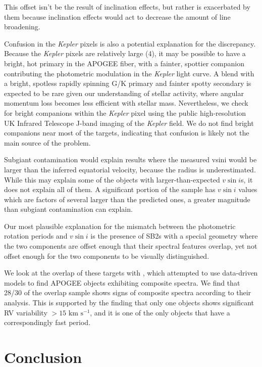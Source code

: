 \documentclass[manuscript]{aastex6}
\newcommand{\vsini}{\ensuremath{v \sin i}}
\newcommand{\Kepler}{\mbox{\textit{Kepler}}}
\newcommand{\kms}{\textrm{ km~s}\ensuremath{^{-1}}}
\begin{document}
This offset isn't be the result of inclination effects, but rather is
exacerbated by them because inclination effects would act to decrease the
amount of line broadening.

Confusion in the \Kepler{} pixels is also a potential explanation for the
discrepancy. Because the \Kepler{} pixels are relatively large (4\arcsec), it
may be possible to have a bright, hot primary in the APOGEE fiber, with a
fainter, spottier companion contributing the photometric modulation in the
\Kepler{} light curve. A blend with a bright, spotless rapidly spinning G/K 
primary and fainter spotty secondary is expected to be rare given our 
understanding of stellar activity, where angular momentum loss becomes less
efficient with stellar mass. Nevertheless, we check for bright companions
within the \Kepler{} pixel using the public high-resolution UK Infrared Telescope
J-band imaging of the \Kepler{} field. We do not find bright companions near
most of the targets, indicating that confusion is likely not the main source of
the problem.

Subgiant contamination would explain results where the measured vsini would be
larger than the inferred equatorial velocity, because the radius is
underestimated. While this may explain some of the objects with
larger-than-expected \vsini{}s, it does not explain all of them. A significant
portion of the sample has \vsini{} values which are factors of several larger
than the predicted ones, a greater magnitude than subgiant contamination can 
explain.

Our most plausible explanation for the mismatch between the photometric
rotation periods and \vsini{} is the presence of SB2s with a special geometry
where the two components are offset enough that their spectral features
overlap, yet not offset enough for the two components to be visually
distinguished. 

We look at the overlap of these targets with \citep{ElBadry18}, which attempted
to use data-driven models to find APOGEE objects exhibiting composite spectra. We 
find that 28/30 of the overlap sample shows signs of composite spectra according
to their analysis. This is supported by the finding that only one 
objects shows significant RV variability \(> 15 \kms\), and it is one of
the only objects that have a correspondingly fast period.

\section{Conclusion}
\label{sec:conclusions}
\end{document}
